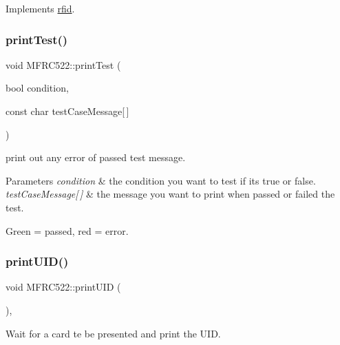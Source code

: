 Implements \mbox{\hyperlink{classrfid_a9790d273f2385c8fb48bb85ca2aa0d10}{rfid}}.

\mbox{\label{class_m_f_r_c522_a0ac8b78d0740d6ca161a21af1c44cf2e}} 
\subsubsection{\texorpdfstring{print\+Test()}{printTest()}}
{\footnotesize\ttfamily void M\+F\+R\+C522\+::print\+Test (\begin{DoxyParamCaption}\item[{bool}]{condition,  }\item[{const char}]{test\+Case\+Message\mbox{[}$\,$\mbox{]} }\end{DoxyParamCaption})\hspace{0.3cm}{\ttfamily [private]}}



print out any error of passed test message. 


\begin{DoxyParams}{Parameters}
{\em condition} & the condition you want to test if it\textquotesingle{}s true or false. \\
\hline
{\em test\+Case\+Message\mbox{[}$\,$\mbox{]}} & the message you want to print when passed or failed the test.\\
\hline
\end{DoxyParams}
Green = passed, red = error. \mbox{\label{class_m_f_r_c522_aee85264d7411b76a3b0817622b428827}} 
\subsubsection{\texorpdfstring{print\+U\+I\+D()}{printUID()}}
{\footnotesize\ttfamily void M\+F\+R\+C522\+::print\+U\+ID (\begin{DoxyParamCaption}{ }\end{DoxyParamCaption})\hspace{0.3cm}{\ttfamily [override]}, {\ttfamily [virtual]}}



Wait for a card te be presented and print the U\+ID. 

